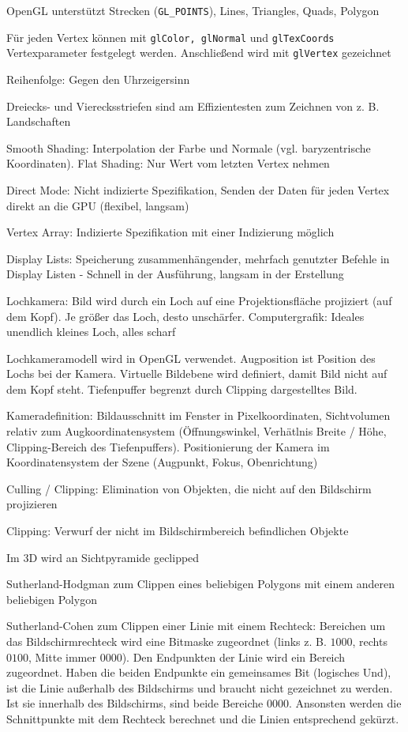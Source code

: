 \documentclass[12pt,landscape]{article}
\begin{document}
\begin{multicols}{3}
\begin{compactitem}
\item OpenGL unterstützt Strecken (\lstinline|GL_POINTS|), Lines, Triangles, Quads, Polygon
\item Für jeden Vertex können mit \lstinline|glColor, glNormal| und \lstinline|glTexCoords| Vertexparameter festgelegt werden. Anschließend wird mit \lstinline|glVertex| gezeichnet
\item Reihenfolge: Gegen den Uhrzeigersinn
\item Dreiecks- und Vierecksstriefen sind am Effizientesten zum Zeichnen von z. B. Landschaften
\item Smooth Shading: Interpolation der Farbe und Normale (vgl. baryzentrische Koordinaten). Flat Shading: Nur Wert vom letzten Vertex nehmen
\item Direct Mode: Nicht indizierte Spezifikation, Senden der Daten für jeden Vertex direkt an die GPU (flexibel, langsam)
\item Vertex Array: Indizierte Spezifikation mit einer Indizierung möglich
\item Display Lists: Speicherung zusammenhängender, mehrfach genutzter Befehle in Display Listen - Schnell in der Ausführung, langsam in der Erstellung
\item Lochkamera: Bild wird durch ein Loch auf eine Projektionsfläche projiziert (auf dem Kopf). Je größer das Loch, desto unschärfer. Computergrafik: Ideales unendlich kleines Loch, alles scharf
\item Lochkameramodell wird in OpenGL verwendet. Augposition ist Position des Lochs bei der Kamera. Virtuelle Bildebene wird definiert, damit Bild nicht auf dem Kopf steht. Tiefenpuffer begrenzt durch Clipping dargestelltes Bild.
\item Kameradefinition: Bildausschnitt im Fenster in Pixelkoordinaten, Sichtvolumen relativ zum Augkoordinatensystem (Öffnungswinkel, Verhätlnis Breite / Höhe, Clipping-Bereich des Tiefenpuffers). Positionierung der Kamera im Koordinatensystem der Szene (Augpunkt, Fokus, Obenrichtung)
\item Culling / Clipping: Elimination von Objekten, die nicht auf den Bildschirm projizieren
\item Clipping: Verwurf der nicht im Bildschirmbereich befindlichen Objekte
\item Im 3D wird an Sichtpyramide geclipped
\item Sutherland-Hodgman zum Clippen eines beliebigen Polygons mit einem anderen beliebigen Polygon
\item Sutherland-Cohen zum Clippen einer Linie mit einem Rechteck: Bereichen um das Bildschirmrechteck wird eine Bitmaske zugeordnet (links z. B. $1000$, rechts $0100$, Mitte immer $0000$). Den Endpunkten der Linie wird ein Bereich zugeordnet. Haben die beiden Endpunkte ein gemeinsames Bit (logisches Und), ist die Linie außerhalb des Bildschirms und braucht nicht gezeichnet zu werden. Ist sie innerhalb des Bildschirms, sind beide Bereiche $0000$. Ansonsten werden die Schnittpunkte mit dem Rechteck berechnet und die Linien entsprechend gekürzt.

\end{compactitem}
\end{multicols}
\end{document}
